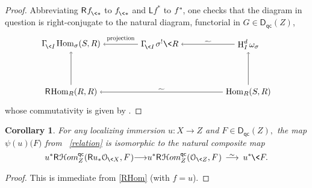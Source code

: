 \documentclass{compositio}
\theoremstyle{plain}
\newtheorem{subcor}[equation]{Corollary}
\theoremstyle{definition}
\theoremstyle{remark}
\numberwithin{equation}{thm}
\begin{document}
\begin{proof} Abbreviating ${\mathsf R}{\mkern1mu}{{f^{}_{{\mkern-1mu}\<*}}}$ to ${{f^{}_{{\mkern-1mu}\<*}}}$ and ${\mathsf L} f^*$ to $f^*{\mkern-1mu}{\mkern-1mu}$, one checks that the diagram in question is right-conjugate to the 
natural diagram, functorial in $G\in{{\boldsymbol{\mathsf{D}}}_{\mathsf{qc}}}(Z)$,
\[

 \begin{tikzpicture}[xscale=3.7, yscale=2]

   \node(11) at (1,-1){$\Gamma^{}_{\!{\mkern-1mu}\<I}{\mkern-1mu}\operatorname{Hom}_\sigma(S,R)$};   
   \node(12) at (2,-1){$\Gamma^{}_{\!{\mkern-1mu}\<I}{\mkern1mu}{\mkern1mu}\sigma^!\<R$}; 
 
   \node(13) at (3,-1){$\textup{H}^d_I\,\omega_\sigma$}; 
 
   \node(21) at (1,-2){${\mathsf R}{\mkern-1mu}{\mkern-1mu}\operatorname{Hom}_R(R,R)$};  
   \node(23) at (3,-2){$\operatorname{Hom}_R(S,R)$};
   
  
    \draw[<-] (11)--(12) node[above=1pt, midway, scale=.75] {$\textup{projection}$};  
    \draw[<-] (12)--(13) node[above=1pt, midway, scale=.75] {${\vbox to 0pt{\vss\hbox{$\widetilde{\phantom{nn}}$}\vskip-7pt}}$}; 
 
    \draw[<-] (21)--(23) node[above=1pt, midway, scale=.75] {${\vbox to 0pt{\vss\hbox{$\widetilde{\phantom{nn}}$}\vskip-7pt}}$}; 
    
 
     \draw[<-] (11)--(21) ;

     \draw[<-] (13)--(23) ;    
    
   \end{tikzpicture}
\]
whose commutativity  is given by \cite[3.4.7(ii)]{li}.
\end{proof}

\begin{subcor}\label{psi via RHom} For any localizing immersion\/  $u\colon X\to Z$  and $F\in{{\boldsymbol{\mathsf{D}}}_{\mathsf{qc}}}(Z),$ 
the map $\psi(u)\big(F\big)$ from ~\textup{\ref{relation}}
is isomorphic to the natural composite map
\[
u^*{{\mathsf R}{\mkern1mu}{{\mathcal H} om}_{{Z}}^{{\mkern-1mu}{\mathsf{qc}}}}({\mathsf R} u_*{\mathcal O_{{\mkern-1mu}\<X}},F{\mkern1mu}){\longrightarrow}
u^*{{\mathsf R}{\mkern1mu}{{\mathcal H} om}_{{Z}}^{{\mkern-1mu}{\mathsf{qc}}}}({\mathcal O_{\<Z}},F{\mkern1mu}){{\mkern8mu\longrightarrow \mkern-25.5mu{}^\sim\mkern17mu}} u^*{\mkern-1mu}\<F.
\]
\end{subcor}

\begin{proof} 
This is immediate from \ref{RHom} (with $f=u$).
\end{proof}
\end{document}
